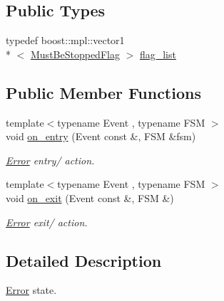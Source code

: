 \subsection*{Public Types}
\begin{DoxyCompactItemize}
\item 
typedef boost\-::mpl\-::vector1\\*
$<$ \hyperlink{structmdt_usbtmc_transfer_handler_state_machine_1_1_must_be_stopped_flag}{Must\-Be\-Stopped\-Flag} $>$ \hyperlink{structmdt_usbtmc_transfer_handler_state_machine_1_1_state_machine___1_1_error_a8ee413501715bb986765bbf7f152d74a}{flag\-\_\-list}
\end{DoxyCompactItemize}
\subsection*{Public Member Functions}
\begin{DoxyCompactItemize}
\item 
{\footnotesize template$<$typename Event , typename F\-S\-M $>$ }\\void \hyperlink{structmdt_usbtmc_transfer_handler_state_machine_1_1_state_machine___1_1_error_abee2b3c027ee07b7f4c558341a8d5b2b}{on\-\_\-entry} (Event const \&, F\-S\-M \&fsm)
\begin{DoxyCompactList}\small\item\em \hyperlink{structmdt_usbtmc_transfer_handler_state_machine_1_1_state_machine___1_1_error}{Error} entry/ action. \end{DoxyCompactList}\item 
{\footnotesize template$<$typename Event , typename F\-S\-M $>$ }\\void \hyperlink{structmdt_usbtmc_transfer_handler_state_machine_1_1_state_machine___1_1_error_aaaf5f3214d6d1a1f5d1ed5c8c5844bec}{on\-\_\-exit} (Event const \&, F\-S\-M \&)
\begin{DoxyCompactList}\small\item\em \hyperlink{structmdt_usbtmc_transfer_handler_state_machine_1_1_state_machine___1_1_error}{Error} exit/ action. \end{DoxyCompactList}\end{DoxyCompactItemize}


\subsection{Detailed Description}
\hyperlink{structmdt_usbtmc_transfer_handler_state_machine_1_1_state_machine___1_1_error}{Error} state. 

